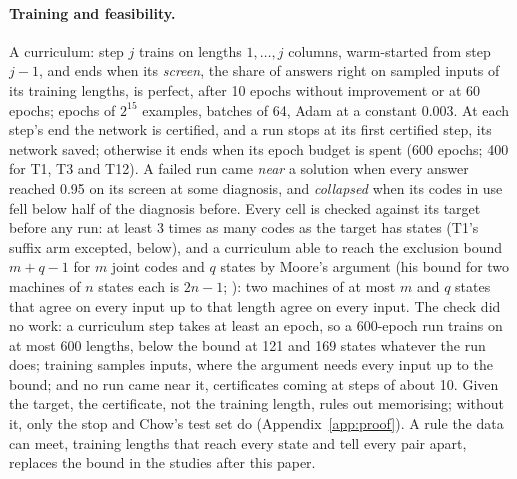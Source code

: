 \documentclass[11pt]{article}
\begin{document}
\paragraph{Training and feasibility.} A curriculum: step $j$ trains on lengths $1, \dots, j$ columns,
warm-started from step $j - 1$, and ends when its \emph{screen}, the share of answers right on
sampled inputs of its training lengths, is perfect, after 10 epochs without
improvement or at 60 epochs; epochs of $2^{15}$ examples, batches of 64, Adam
\citep{kingma-2015-adam} at a constant 0.003. At each step's end the network is certified, and a run
stops at its first certified step, its network saved; otherwise it ends when its epoch budget is
spent (600 epochs; 400 for T1, T3 and T12). A failed run came \emph{near} a solution when every
answer reached 0.95 on its screen at some diagnosis, and \emph{collapsed} when its codes in use fell
below half of the diagnosis before. Every cell is checked against its target before any run: at
least 3 times as many codes as the target has states (T1's suffix arm excepted, below), and a curriculum able to reach the exclusion
bound $m + q - 1$ for $m$ joint codes and $q$ states
by Moore's argument (his bound for two machines of $n$ states each is $2n - 1$;
\citealp[Theorem 7]{moore-1956-gedanken-experiments-sequential-machines}): two machines of at most $m$ and $q$
states that agree on every input up to that length agree on every input. The check did no work: a
curriculum step takes at least an epoch, so a 600-epoch run trains on at most 600 lengths, below the
bound at 121 and 169 states whatever the run does; training samples inputs, where the argument needs
every input up to the bound; and no run came near it, certificates coming at steps of about 10. Given
the target, the certificate, not the training length, rules out memorising; without it, only the
stop and Chow's test set do (Appendix~\ref{app:proof}). A rule the data can meet, training lengths
that reach every state and tell every pair apart, replaces the bound in the studies after this
paper.
\end{document}
